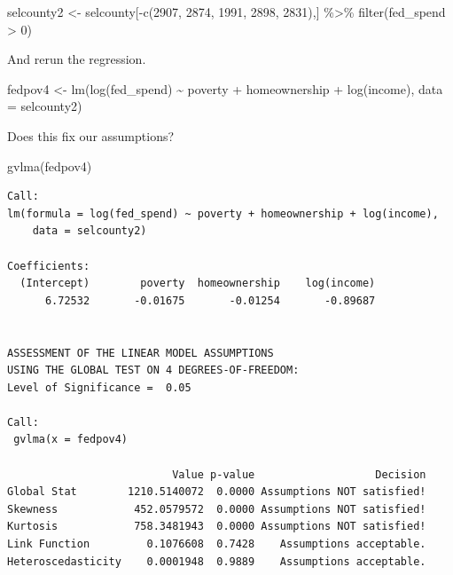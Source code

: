 \documentclass[
]{book}
\makeatletter
\newenvironment{Shaded}{\begin{snugshade}}{\end{snugshade}}
\newcommand{\AttributeTok}[1]{\textcolor[rgb]{0.61,0.61,0.61}{#1}}
\newcommand{\DecValTok}[1]{\textcolor[rgb]{0.06,0.06,0.06}{#1}}
\newcommand{\FunctionTok}[1]{\textcolor[rgb]{0,0,0}{#1}}
\newcommand{\NormalTok}[1]{#1}
\newcommand{\OtherTok}[1]{\textcolor[rgb]{0.37,0.37,0.37}{#1}}
\newcommand{\SpecialCharTok}[1]{\textcolor[rgb]{0,0,0}{#1}}
\newenvironment{kframe}{%
\medskip{}
\setlength{\fboxsep}{.8em}
 \def\at@end@of@kframe{}%
 \ifinner\ifhmode%
  \def\at@end@of@kframe{\end{minipage}}%
  \begin{minipage}{\columnwidth}%
 \fi\fi%
 \def\FrameCommand##1{\hskip\@totalleftmargin \hskip-\fboxsep
 \colorbox{shadecolor}{##1}\hskip-\fboxsep
     \hskip-\linewidth \hskip-\@totalleftmargin \hskip\columnwidth}%
 \MakeFramed {\advance\hsize-\width
   \@totalleftmargin\z@ \linewidth\hsize
   \@setminipage}}%
 {\par\unskip\endMakeFramed%
 \at@end@of@kframe}
\renewenvironment{Shaded}{\begin{kframe}}{\end{kframe}}
\makeatother
\begin{document}
\begin{Shaded}
\begin{Highlighting}[]
\NormalTok{selcounty2 }\OtherTok{\textless{}{-}}\NormalTok{ selcounty[}\SpecialCharTok{{-}}\FunctionTok{c}\NormalTok{(}\DecValTok{2907}\NormalTok{, }\DecValTok{2874}\NormalTok{, }\DecValTok{1991}\NormalTok{, }\DecValTok{2898}\NormalTok{, }\DecValTok{2831}\NormalTok{),] }\SpecialCharTok{\%\textgreater{}\%} 
  \FunctionTok{filter}\NormalTok{(fed\_spend }\SpecialCharTok{\textgreater{}} \DecValTok{0}\NormalTok{)}
\end{Highlighting}
\end{Shaded}

And rerun the regression.

\begin{Shaded}
\begin{Highlighting}[]
\NormalTok{fedpov4 }\OtherTok{\textless{}{-}} \FunctionTok{lm}\NormalTok{(}\FunctionTok{log}\NormalTok{(fed\_spend) }\SpecialCharTok{\textasciitilde{}}\NormalTok{ poverty }\SpecialCharTok{+}\NormalTok{ homeownership }\SpecialCharTok{+} \FunctionTok{log}\NormalTok{(income), }
              \AttributeTok{data =}\NormalTok{ selcounty2)}
\end{Highlighting}
\end{Shaded}

Does this fix our assumptions?

\begin{Shaded}
\begin{Highlighting}[]
\FunctionTok{gvlma}\NormalTok{(fedpov4)}
\end{Highlighting}
\end{Shaded}

\begin{verbatim}
Call:
lm(formula = log(fed_spend) ~ poverty + homeownership + log(income), 
    data = selcounty2)

Coefficients:
  (Intercept)        poverty  homeownership    log(income)  
      6.72532       -0.01675       -0.01254       -0.89687  


ASSESSMENT OF THE LINEAR MODEL ASSUMPTIONS
USING THE GLOBAL TEST ON 4 DEGREES-OF-FREEDOM:
Level of Significance =  0.05 

Call:
 gvlma(x = fedpov4) 

                          Value p-value                   Decision
Global Stat        1210.5140072  0.0000 Assumptions NOT satisfied!
Skewness            452.0579572  0.0000 Assumptions NOT satisfied!
Kurtosis            758.3481943  0.0000 Assumptions NOT satisfied!
Link Function         0.1076608  0.7428    Assumptions acceptable.
Heteroscedasticity    0.0001948  0.9889    Assumptions acceptable.
\end{verbatim}
\end{document}
